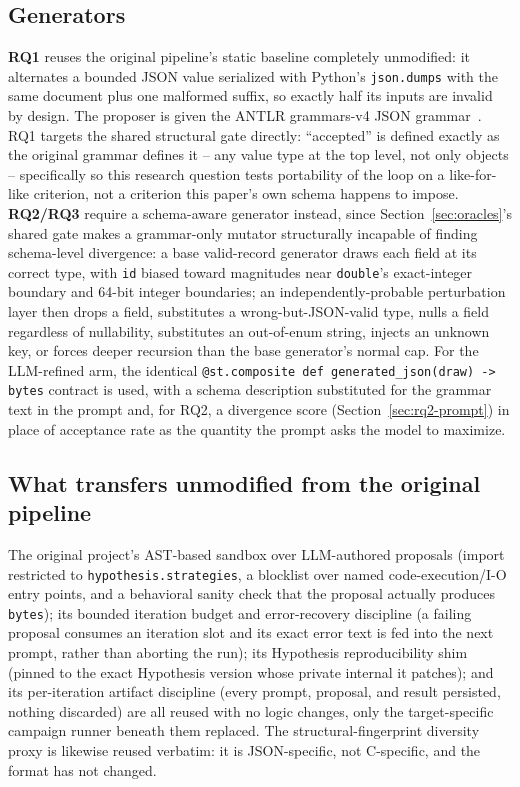 \subsection{Generators}
\label{sec:generators}
\textbf{RQ1} reuses the original pipeline's static baseline completely
unmodified: it alternates a bounded JSON value serialized with Python's
\texttt{json.dumps} with the same document plus one malformed suffix, so
exactly half its inputs are invalid by design. The proposer is given the
ANTLR grammars-v4 JSON grammar~\cite{antlr2024grammarsv4,parr2013antlr}.
RQ1 targets the shared structural gate directly:
``accepted'' is defined exactly as the original grammar defines it -- any
value type at the top level, not only objects -- specifically so this
research question tests portability of the loop on a
like-for-like criterion, not a criterion this paper's own schema happens to
impose. \textbf{RQ2/RQ3} require a schema-aware generator instead, since
Section~\ref{sec:oracles}'s shared gate makes a grammar-only mutator
structurally incapable of finding schema-level divergence: a base
valid-record generator draws each field at its correct type, with
\texttt{id} biased toward magnitudes near \texttt{double}'s exact-integer
boundary and 64-bit integer boundaries; an independently-probable
perturbation layer then drops a field, substitutes a wrong-but-JSON-valid
type, nulls a field regardless of nullability, substitutes an out-of-enum
string, injects an unknown key, or forces deeper recursion than the base
generator's normal cap. For the LLM-refined arm, the identical
\texttt{@st.composite def generated\_json(draw) -> bytes} contract is used,
with a schema description substituted for the grammar text in the prompt
and, for RQ2, a divergence score (Section~\ref{sec:rq2-prompt}) in place of
acceptance rate as the quantity the prompt asks the model to maximize.

\subsection{What transfers unmodified from the original pipeline}
The original project's AST-based sandbox over LLM-authored proposals
(import restricted to \texttt{hypothesis.strategies}, a blocklist over
named code-execution/I-O entry points, and a behavioral sanity check that
the proposal actually produces \texttt{bytes}); its bounded iteration
budget and error-recovery discipline (a failing proposal consumes an
iteration slot and its exact error text is fed into the next prompt, rather
than aborting the run); its Hypothesis reproducibility shim (pinned to the exact
Hypothesis version whose private internal it patches); and its per-iteration
artifact discipline (every prompt, proposal, and result persisted, nothing
discarded) are all reused with no logic changes, only the target-specific
campaign runner beneath them replaced. The structural-fingerprint
diversity proxy is likewise reused verbatim: it is JSON-specific, not
C-specific, and the format has not changed.

